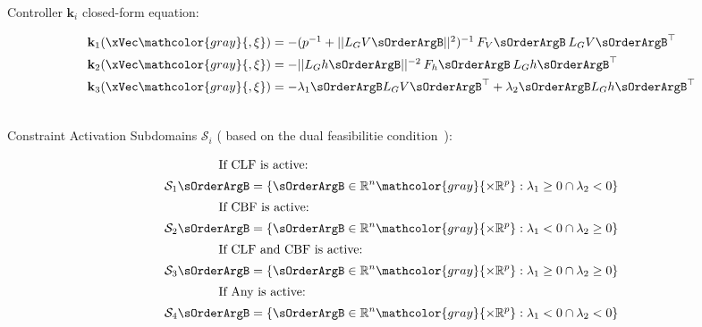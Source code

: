 Controller \(\mathbf{k}_i\) closed-form equation:

\begin{equation}
    \begin{array}{l}
    \mathbf{k}_1(\xVec \mathcolor{gray}{, \mathbf{\xi}}) = -(p^{-1} + ||L_GV \sOrderArgB||^2)^{-1} \hspace{0.2em} F_V\sOrderArgB \hspace{0.2em} L_GV\sOrderArgB^{\top} \vspace{0.5em} \\ 
    \mathbf{k}_2(\xVec \mathcolor{gray}{, \mathbf{\xi}}) = -||L_Gh \sOrderArgB||^{-2} \hspace{0.2em} F_h \sOrderArgB \hspace{0.2em} L_Gh \sOrderArgB^{\top} \vspace{0.5em} \\ 
    \mathbf{k}_3(\xVec \mathcolor{gray}{, \mathbf{\xi}}) = -\lambda_1\sOrderArgB L_GV \sOrderArgB^{\top} + \lambda_2\sOrderArgB L_Gh \sOrderArgB^{\top} \vspace{1.5em}
    \label{eq:closed-form_controller_formulas}
    \end{array} 
\end{equation}



Constraint Activation Subdomains \(\mathcal{S}_i\) ( based on the dual feasibilitie condition~):

\begin{align}
    \intertext{\hspace{4em} If CLF is active: }
    \mathcal{S}_1 \sOrderArgB = \{ \sOrderArgB \in \mathbb{R}^n \mathcolor{gray}{\times \mathbb{R}^p}: \lambda_1 \geq 0 \cap \lambda_2 < 0 \}
    \notag \\
    \intertext{\hspace{4em} If CBF is active:}
    \mathcal{S}_2 \sOrderArgB = \{ \sOrderArgB \in \mathbb{R}^n \mathcolor{gray}{\times \mathbb{R}^p}: \lambda_1 < 0 \cap \lambda_2 \geq 0 \}
    \notag \\
    \label{eq:Constraints_Activation_Subdomains}
    \intertext{\hspace{4em} If CLF and CBF is active:}
    \mathcal{S}_3 \sOrderArgB = \{ \sOrderArgB \in \mathbb{R}^n \mathcolor{gray}{\times \mathbb{R}^p}: \lambda_1 \geq 0 \cap \lambda_2 \geq 0 \}
    \notag\\
    \intertext{\hspace{4em} If Any is active:}
    \mathcal{S}_4\sOrderArgB = \{ \sOrderArgB \in \mathbb{R}^n \mathcolor{gray}{\times \mathbb{R}^p}: \lambda_1 < 0 \cap \lambda_2 < 0 \}
    \notag
\end{align}


